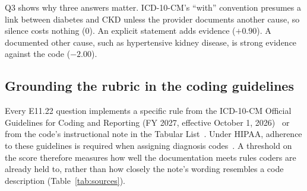 \documentclass[10pt,letterpaper]{article}
\begin{document}
Q3 shows why three answers matter. ICD-10-CM's ``with'' convention presumes a link between diabetes and CKD unless the provider documents another cause, so silence costs nothing (0). An explicit statement adds evidence ($+0.90$). A documented other cause, such as hypertensive kidney disease, is strong evidence against the code ($-2.00$).

\FloatBarrier
\subsection{Grounding the rubric in the coding guidelines}\label{sec:grounding}

Every E11.22 question implements a specific rule from the ICD-10-CM Official Guidelines for Coding and Reporting (FY 2027, effective October 1, 2026)~\cite{guidelines} or from the code's instructional note in the Tabular List~\cite{tabular}. Under HIPAA, adherence to these guidelines is required when assigning diagnosis codes~\cite{guidelines}. A threshold on the score therefore measures how well the documentation meets rules coders are already held to, rather than how closely the note's wording resembles a code description (Table~\ref{tab:sources}).
\end{document}
